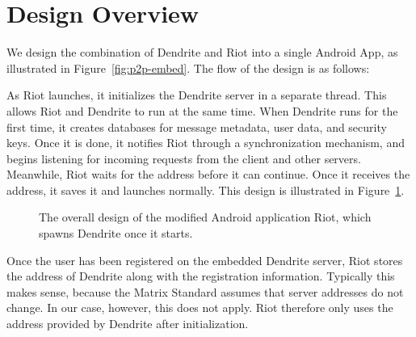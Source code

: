 \section{Design Overview}
We design the combination of Dendrite and Riot into a single Android App, as illustrated in Figure~\ref{fig:p2p-embed}.
The flow of the design is as follows:

As Riot launches, it initializes the Dendrite server in a separate thread.
This allows Riot and Dendrite to run at the same time.
When Dendrite runs for the first time, it creates databases for message metadata, user data, and security keys.
Once it is done, it notifies Riot through a synchronization mechanism, and begins listening for incoming requests from the client and other servers.
Meanwhile, Riot waits for the address before it can continue.
Once it receives the address, it saves it and launches normally.
This design is illustrated in Figure~\ref{fig:design_overview}.

\begin{figure}
	\centering
	\resizebox{0.5\linewidth}{!}{}
	\caption{%
		The overall design of the modified Android application Riot, which spawns Dendrite once it starts.
	}%
	\label{fig:design_overview}
\end{figure}

Once the user has been registered on the embedded Dendrite server, Riot stores the address of Dendrite along with the registration information.
Typically this makes sense, because the Matrix Standard assumes that server addresses do not change.
In our case, however, this does not apply.
Riot therefore only uses the address provided by Dendrite after initialization.

